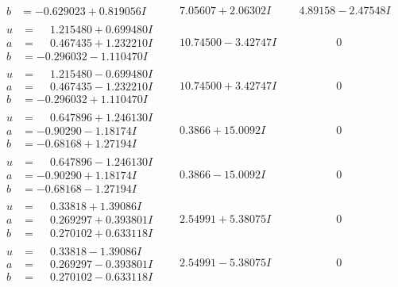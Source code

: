 \documentclass[1p]{elsarticle_modified}
\theoremstyle{definition}
\begin{document}
$$\begin{array}{c|c|c}
\begin{aligned}
b &= -0.629023 + 0.819056 I\end{aligned}
 & \phantom{-}7.05607 + 2.06302 I & \phantom{-}4.89158 - 2.47548 I \\ \hline\begin{aligned}
u &= \phantom{-}1.215480 + 0.699480 I \\
a &= \phantom{-}0.467435 + 1.232210 I \\
b &= -0.296032 - 1.110470 I\end{aligned}
 & \phantom{-}10.74500 - 3.42747 I & \phantom{-0.000000 } 0 \\ \hline\begin{aligned}
u &= \phantom{-}1.215480 - 0.699480 I \\
a &= \phantom{-}0.467435 - 1.232210 I \\
b &= -0.296032 + 1.110470 I\end{aligned}
 & \phantom{-}10.74500 + 3.42747 I & \phantom{-0.000000 } 0 \\ \hline\begin{aligned}
u &= \phantom{-}0.647896 + 1.246130 I \\
a &= -0.90290 - 1.18174 I \\
b &= -0.68168 + 1.27194 I\end{aligned}
 & \phantom{-}0.3866 + 15.0092 I & \phantom{-0.000000 } 0 \\ \hline\begin{aligned}
u &= \phantom{-}0.647896 - 1.246130 I \\
a &= -0.90290 + 1.18174 I \\
b &= -0.68168 - 1.27194 I\end{aligned}
 & \phantom{-}0.3866 - 15.0092 I & \phantom{-0.000000 } 0 \\ \hline\begin{aligned}
u &= \phantom{-}0.33818 + 1.39086 I \\
a &= \phantom{-}0.269297 + 0.393801 I \\
b &= \phantom{-}0.270102 + 0.633118 I\end{aligned}
 & \phantom{-}2.54991 + 5.38075 I & \phantom{-0.000000 } 0 \\ \hline\begin{aligned}
u &= \phantom{-}0.33818 - 1.39086 I \\
a &= \phantom{-}0.269297 - 0.393801 I \\
b &= \phantom{-}0.270102 - 0.633118 I\end{aligned}
 & \phantom{-}2.54991 - 5.38075 I & \phantom{-0.000000 } 0 \\ \hline\begin{aligned}

\end{aligned}
\end{array}$$
\end{document}
